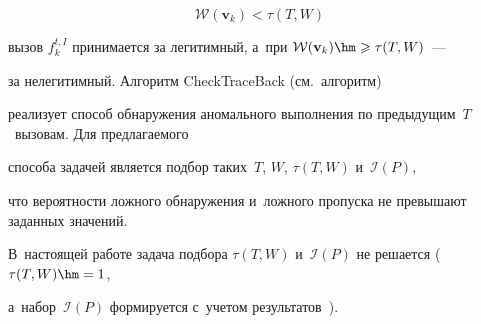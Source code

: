 \begin{equation}

\label{second_chance}

\mathcal{W}(\mathbf{v}_{k})< \tau(T,W)

\end{equation} 

вызов $f^{t,I}_{k}$ принимается за легитимный, а~при $\mathcal{W}(\mathbf{v}_{k})\hm\geqslant \tau(T,W)$~--- 

за нелегитимный. Алгоритм \textsf{CheckTraceBack} (см.\ алгоритм) 

реализует способ обнаружения аномального выполнения по предыдущим~$T$~вызовам. Для предлагаемого

 способа задачей является подбор таких~$T$, $W$, $\tau(T,W)$ и~$\mathcal{I}(P)$, 

 что вероятности ложного обнаружения и~ложного пропуска не превышают заданных значений. 

 В~настоящей работе задача подбора $\tau(T,W)$ и~$\mathcal{I}(P)$ не решается ($\tau(T,W)\hm=1$, 

 а~набор~$\mathcal{I}(P)$ формируется с~учетом результатов~\cite{Gupta2018}).



